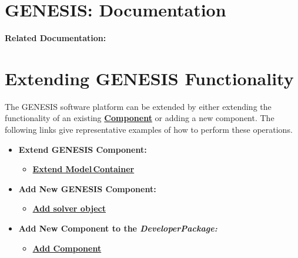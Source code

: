 \documentclass[12pt]{article}
\begin{document}
\section*{GENESIS: Documentation}

{\bf Related Documentation:}

\section*{Extending GENESIS Functionality}

The GENESIS software platform can be extended by either extending the functionality of an existing \href{../reserved-words/reserved-words.tex}{\bf Component} or adding a new component. The following links give representative examples of how to perform these operations.

\begin{itemize}
   \item[]{\bf Extend GENESIS Component:}
      \begin{itemize}
         \item[]\href{../genesis-extend-model-container/genesis-extend-model-container.tex}{\bf Extend Model\,Container}
      \end{itemize}
      
   \item[]{\bf Add New GENESIS Component:}
      \begin{itemize}
         \item[]\href{../genesis-add-object-solver/genesis-add-object-solver.tex}{\bf Add solver object}
      \end{itemize}
      
   \item[]{\bf Add New Component to the {\it DeveloperPackage:}}
      \begin{itemize}
         \item[]\href{../genesis-addto-component-developerpackage/genesis-addto-component-developerpackage.tex}{\bf Add Component}
      \end{itemize} 
\end{itemize}
\end{document}
